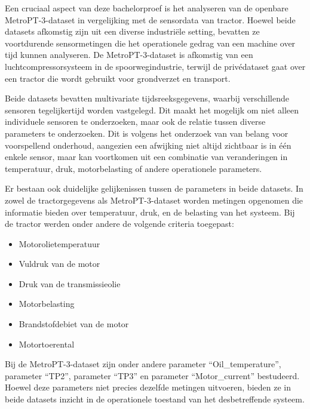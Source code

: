 Een cruciaal aspect van deze bachelorproef is het analyseren van de openbare Metr\-oPT-3-dataset in vergelijking met de sensordata van tractor. Hoewel beide datasets afkomstig zijn uit een diverse industriële setting, bevatten ze voortdurende sensormetingen die het operationele gedrag van een machine over tijd kunnen analyseren. De MetroPT-3-dataset is afkomstig van een luchtcompressorsysteem in de spoorwegindustrie, terwijl de privédataset gaat over een tractor die wordt gebruikt voor grondverzet en transport.

Beide datasets bevatten multivariate tijdsreeksgegevens, waarbij verschillende sensoren tegelijkertijd worden vastgelegd. Dit maakt het mogelijk om niet alleen individuele sensoren te onderzoeken, maar ook de relatie tussen diverse parameters te onderzoeken. Dit is volgens het onderzoek van \textcite{Carvalho2019} van belang voor voorspellend onderhoud, aangezien een afwijking niet altijd zichtbaar is in één enkele sensor, maar kan voortkomen uit een combinatie van veranderingen in temperatuur, druk, motorbelasting of andere operationele parameters.

Er bestaan ook duidelijke gelijkenissen tussen de parameters in beide datasets. In zowel de tractorgegevens als MetroPT-3-dataset worden metingen opgenomen die informatie bieden over temperatuur, druk, en de belasting van het systeem. Bij de tractor werden onder andere de volgende criteria toegepast:


\begin{itemize}
    
    \item Motorolietemperatuur
    
    \item Vuldruk van de motor
    
    \item Druk van de transmissieolie
    
    \item Motorbelasting
    
    \item Brandstofdebiet van de motor
    
    \item Motortoerental
    
\end{itemize}

Bij de MetroPT-3-dataset zijn onder andere parameter ``Oil\_temperature'', parameter ``TP2'', parameter ``TP3'' en parameter ``Motor\_current'' bestudeerd. Hoewel deze parameters niet precies dezelfde metingen uitvoeren, bieden ze in beide datasets inzicht in de operationele toestand van het desbetreffende systeem.

